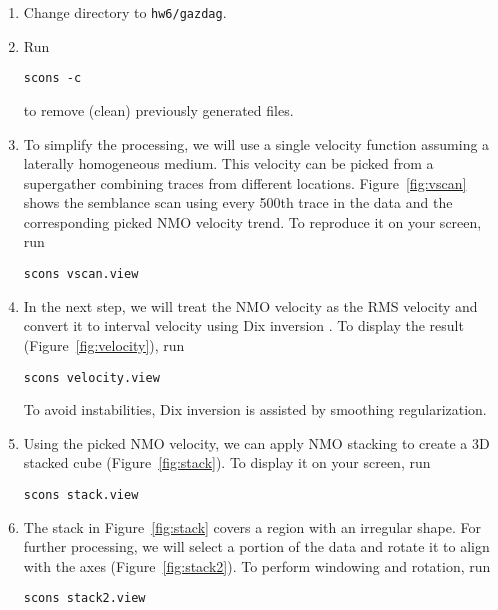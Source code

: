 \begin{enumerate}

\item Change directory to \texttt{hw6/gazdag}.
\item Run
\begin{verbatim}
scons -c
\end{verbatim}
to remove (clean) previously generated files.

\item To simplify the processing, we will use a single velocity function assuming a laterally homogeneous medium. This velocity can be picked from a supergather combining traces from different locations. Figure~\ref{fig:vscan} shows the semblance scan using every 500th trace in the data and the corresponding picked NMO velocity trend. To reproduce it on your screen, run
\begin{verbatim}
scons vscan.view
\end{verbatim}



\item In the next step, we will treat the NMO velocity as the RMS velocity and convert it to interval velocity using Dix inversion \cite[]{GEO20-01-00680086}. To display the result (Figure~\ref{fig:velocity}), run
\begin{verbatim}
scons velocity.view
\end{verbatim}
To avoid instabilities, Dix inversion is assisted by smoothing regularization.
\item Using the picked NMO velocity, we can apply NMO stacking to create a 3D stacked cube (Figure~\ref{fig:stack}). To display it on your screen, run
\begin{verbatim}
scons stack.view
\end{verbatim}


\item The stack in Figure~\ref{fig:stack} covers a region with an irregular shape. For further processing, we will select a portion of the data and rotate it to align with the axes (Figure~\ref{fig:stack2}). To perform windowing and rotation, run
\begin{verbatim}
scons stack2.view
\end{verbatim}


\end{enumerate}
